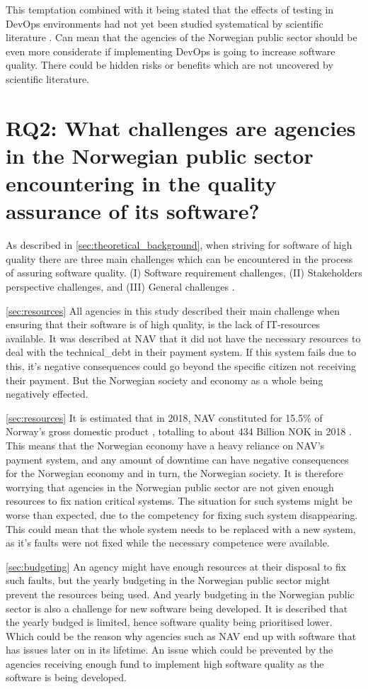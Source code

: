 This temptation combined with it being stated that the effects of testing in DevOps environments had not yet been studied systematical by scientific literature \cite{dsc_2019}\cite{ja_2016}. Can mean that the agencies of the Norwegian public sector should be even more considerate if implementing DevOps is going to increase software quality. There could be hidden risks or benefits which are not uncovered by scientific literature.


\section{RQ2: What challenges are agencies in the Norwegian public sector encountering in the quality assurance of its software?}
As described in \autoref{sec:theoretical_background}, when striving for software of high quality there are three main challenges which can be encountered in the process of assuring software quality. (I) Software requirement challenges, (II) Stakeholders perspective challenges, and (III) General challenges \cite{sh_2018}.

\autoref{sec:resources} All agencies in this study described their main challenge when ensuring that their software is of high quality, is the lack of IT-resources available. It was described at NAV that it did not have the necessary resources to deal with the \gls{technical_debt} in their payment system. If this system fails due to this, it's negative consequences could go beyond the specific citizen not receiving their payment. But the Norwegian society and economy as a whole being negatively effected.

\autoref{sec:resources} It is estimated that in 2018, NAV constituted for 15.5\% of Norway's gross domestic product \cite{nav_ytelsene_frem_mot_2060_2019}, totalling to about 434 Billion NOK in 2018 \cite{faktaark_finansdepartementet_2020}. This means that the Norwegian economy have a heavy reliance on NAV's payment system, and any amount of downtime can have negative consequences for the Norwegian economy and in turn, the Norwegian society. It is therefore worrying that agencies in the Norwegian public sector are not given enough resources to fix nation critical systems. The situation for such systems might be worse than expected, due to the competency for fixing such system disappearing. This could mean that the whole system needs to be replaced with a new system, as it's faults were not fixed while the necessary competence were available.

\autoref{sec:budgeting} An agency might have enough resources at their disposal to fix such faults, but the yearly budgeting in the Norwegian public sector might prevent the resources being used. And yearly budgeting in the Norwegian public sector is also a challenge for new software being developed. It is described that the yearly budged is limited, hence software quality being prioritised lower. Which could be the reason why agencies such as NAV end up with software that has issues later on in its lifetime. An issue which could be prevented by the agencies receiving enough fund to implement high software quality as the software is being developed.

